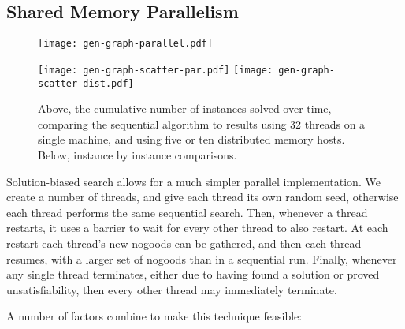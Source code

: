 \documentclass[runningheads]{llncs}
\begin{document}
\subsection{Shared Memory Parallelism}

\begin{figure}[tb]
    \texttt{[image: gen-graph-parallel.pdf]}

    \medskip

    \texttt{[image: gen-graph-scatter-par.pdf]}
    \hfill
    \texttt{[image: gen-graph-scatter-dist.pdf]}

    \caption{Above, the cumulative number of instances solved over time, comparing the sequential
    algorithm to results using 32 threads on a single machine, and using five or ten distributed
    memory hosts. Below, instance by instance comparisons.}\label{figure:parallel}
\end{figure}

Solution-biased search allows for a much simpler parallel implementation. We
create a number of threads, and give each thread its own random seed, otherwise each thread
performs the same sequential search. Then, whenever a thread restarts, it uses a barrier to wait for
every other thread to also restart. At each restart each thread's new nogoods can be gathered, and
then each thread resumes, with a larger set of nogoods than in a sequential run. Finally, whenever
any single thread terminates, either due to having found a solution or proved unsatisfiability,
then every other thread may immediately terminate.

A number of factors combine to make this technique feasible:
\end{document}
